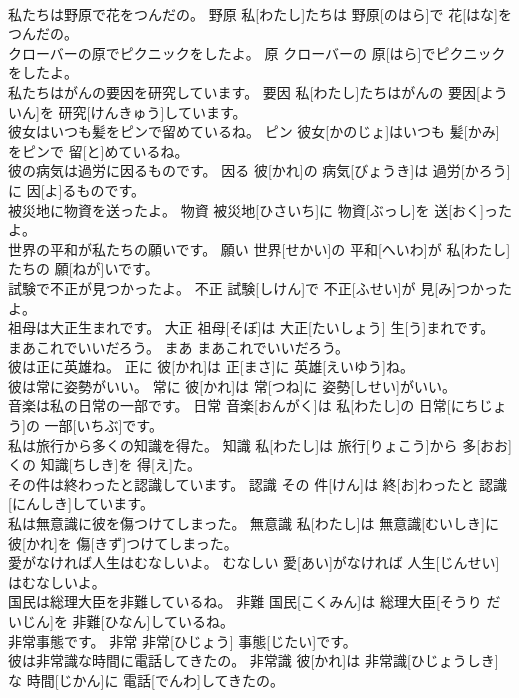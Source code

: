 \documentclass[8pt]{extreport}
\begin{document}
\begin{CJK}{UTF8}{min}
\\	私たちは野原で花をつんだの。	野原	私[わたし]たちは 野原[のはら]で 花[はな]をつんだの。	
\\	クローバーの原でピクニックをしたよ。	原	クローバーの 原[はら]でピクニックをしたよ。	
\\	私たちはがんの要因を研究しています。	要因	私[わたし]たちはがんの 要因[よういん]を 研究[けんきゅう]しています。	
\\	彼女はいつも髪をピンで留めているね。	ピン	彼女[かのじょ]はいつも 髪[かみ]をピンで 留[と]めているね。	
\\	彼の病気は過労に因るものです。	因る	彼[かれ]の 病気[びょうき]は 過労[かろう]に 因[よ]るものです。	
\\	被災地に物資を送ったよ。	物資	被災地[ひさいち]に 物資[ぶっし]を 送[おく]ったよ。	
\\	世界の平和が私たちの願いです。	願い	世界[せかい]の 平和[へいわ]が 私[わたし]たちの 願[ねが]いです。	
\\	試験で不正が見つかったよ。	不正	試験[しけん]で 不正[ふせい]が 見[み]つかったよ。	
\\	祖母は大正生まれです。	大正	祖母[そぼ]は 大正[たいしょう] 生[う]まれです。	
\\	まあこれでいいだろう。	まあ	まあこれでいいだろう。	
\\	彼は正に英雄ね。	正に	彼[かれ]は 正[まさ]に 英雄[えいゆう]ね。	
\\	彼は常に姿勢がいい。	常に	彼[かれ]は 常[つね]に 姿勢[しせい]がいい。	
\\	音楽は私の日常の一部です。	日常	音楽[おんがく]は 私[わたし]の 日常[にちじょう]の 一部[いちぶ]です。	
\\	私は旅行から多くの知識を得た。	知識	私[わたし]は 旅行[りょこう]から 多[おお]くの 知識[ちしき]を 得[え]た。	
\\	その件は終わったと認識しています。	認識	その 件[けん]は 終[お]わったと 認識[にんしき]しています。	
\\	私は無意識に彼を傷つけてしまった。	無意識	私[わたし]は 無意識[むいしき]に 彼[かれ]を 傷[きず]つけてしまった。	
\\	愛がなければ人生はむなしいよ。	むなしい	愛[あい]がなければ 人生[じんせい]はむなしいよ。	
\\	国民は総理大臣を非難しているね。	非難	国民[こくみん]は 総理大臣[そうり だいじん]を 非難[ひなん]しているね。	
\\	非常事態です。	非常	非常[ひじょう] 事態[じたい]です。	
\\	彼は非常識な時間に電話してきたの。	非常識	彼[かれ]は 非常識[ひじょうしき]な 時間[じかん]に 電話[でんわ]してきたの。	

\end{CJK}
\end{document}
